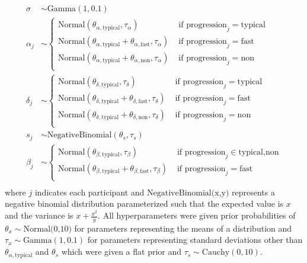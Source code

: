 \documentclass[12pt]{article}
\begin{document}
\begin{align*}
  \sigma & \sim \text{Gamma}(1,0.1)\\
  \alpha_j& \sim \begin{cases}
    \text{Normal}(\theta_{\alpha,\text{typical}},\tau_{\alpha})  &\text{ if } \text{progression}_j=\text{typical}\\
    \text{Normal}(\theta_{\alpha,\text{typical}}+\theta_{\alpha,\text{fast}},\tau_{\alpha}) &\text{ if } \text{progression}_j=\text{fast}\\
    \text{Normal}(\theta_{\alpha,\text{typical}}+\theta_{\alpha,\text{non}},\tau_{\alpha}) &\text{ if } \text{progression}_j=\text{non}\\
  \end{cases}\\
  \delta_j& \sim \begin{cases}
    \text{Normal}(\theta_{\delta,\text{typical}},\tau_{\delta})  &\text{ if } \text{progression}_j=\text{typical}\\
    \text{Normal}(\theta_{\delta,\text{typical}}+\theta_{\delta,\text{fast}},\tau_{\delta}) &\text{ if } \text{progression}_j=\text{fast}\\
    \text{Normal}(\theta_{\delta,\text{typical}}+\theta_{\delta,\text{non}},\tau_{\delta}) &\text{ if } \text{progression}_j=\text{non}\\
  \end{cases}\\
  s_j & \sim \text{NegativeBinomial}(\theta_s,\tau_s)\\
  \beta_j& \sim \begin{cases}
    \text{Normal}(\theta_{\beta,\text{typical}},\tau_{\beta})  &\text{ if } \text{progression}_j\in\text{typical,non}\\
    \text{Normal}(\theta_{\beta,\text{typical}}+\theta_{\beta,\text{fast}},\tau_{\beta}) &\text{ if } \text{progression}_j=\text{fast}\\
  \end{cases}\\
\end{align*}
where $j$ indicates each participant and $\text{NegativeBinomial(x,y)}$ represents a negative binomial distribution parameterized such that the expected value is $x$ and the variance is $x+\frac{x^2}{y}$. All hyperparameters were given prior probabilities of $\theta_x \sim \text{Normal(0,10)}$ for parameters representing the means of a distribution and $\tau_x \sim \text{Gamma}(1,0.1)$ for parameters representing standard deviations other than $\theta_{\alpha,\text{typical}}$ and $\theta_s$ which were given a flat prior and $\tau_s \sim \text{Cauchy}(0,10)$.
\end{document}
